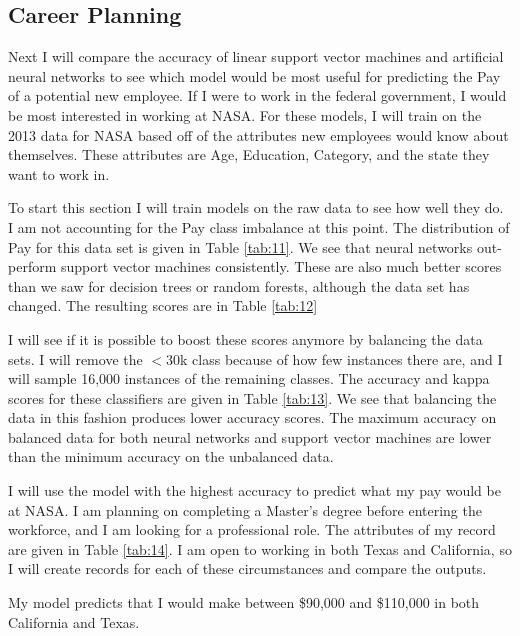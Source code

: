 \documentclass{article}
\begin{document}
    \subsection{Career Planning}
    Next I will compare the accuracy of linear support vector machines and artificial neural networks to see which model would be most useful for predicting the Pay of a potential new employee. If I were to work in the federal government, I would be most interested in working at NASA. For these models, I will train on the 2013 data for NASA based off of the attributes new employees would know about themselves. These attributes are Age, Education, Category, and the state they want to work in.
    \par
    To start this section I will train models on the raw data to see how well they do. I am not accounting for the Pay class imbalance at this point. The distribution of Pay for this data set is given in Table \ref{tab:11}. We see that neural networks out-perform support vector machines consistently. These are also much better scores than we saw for decision trees or random forests, although the data set has changed. The resulting scores are in Table \ref{tab:12}
    \par
    I will see if it is possible to boost these scores anymore by balancing the data sets. I will remove the $<$30k class because of how few instances there are, and I will sample 16,000 instances of the remaining classes. The accuracy and kappa scores for these classifiers are given in Table \ref{tab:13}. We see that balancing the data in this fashion produces lower accuracy scores. The maximum accuracy on balanced data for both neural networks and support vector machines are lower than the minimum accuracy on the unbalanced data.
    \par
    I will use the model with the highest accuracy to predict what my pay would be at NASA. I am planning on completing a Master's degree before entering the workforce, and I am looking for a professional role. The attributes of my record are given in Table \ref{tab:14}. I am open to working in both Texas and California, so I will create records for each of these circumstances and compare the outputs.
    \par
    My model predicts that I would make between \$90,000 and \$110,000 in both California and Texas.
\end{document}
